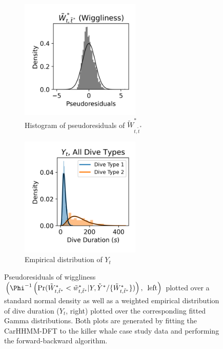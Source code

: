 \begin{figure}[ht]
    \begin{subfigure}{0.45\textwidth}
    	\centering
    	\includegraphics[width=2.25in]{../Plots/2019/20190902-182840-CATs_OB_1_0_267_CarHHMM2_pseudresids_ahat.png}
    	\caption{Histogram of pseudoresiduals of $\tilde W^*_{t,\tilde t^*}$}
    	\label{fig:pseudoresids}
    \end{subfigure}
    \begin{subfigure}{0.45\textwidth}
    	\centering
    	\includegraphics[width=2.25in]{../Plots/2019/20190902-182840-CATs_OB_1_0_267_CarHHMM2_empirical_hist_dive_duration.png}
    	\caption{Empirical distribution of $Y_t$}
    	\label{fig:empirical_dist}
    \end{subfigure}
    \caption{Pseudoresiduals of wiggliness $\left(\Phi^{-1} \left(\Pr(\Ztwo_{t,\tilde t^*} < \ztwo_{t,\tilde t^*}|Y,\tilde Y^* / \{\Ztwo_{t,\tilde t^*}\}) \right), \enspace \text{left} \right)$ plotted over a standard normal density as well as a weighted empirical distribution of dive duration ($Y_t$, right) plotted over the corresponding fitted Gamma distributions. Both plots are generated by fitting the CarHHMM-DFT to the killer whale case study data and performing the forward-backward algorithm.}
    \label{fig:model_checking}
\end{figure}


